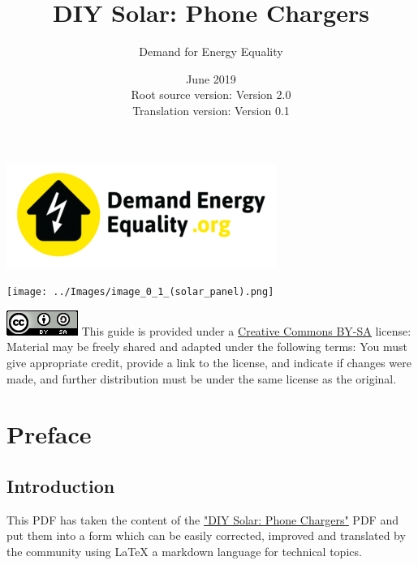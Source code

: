 \documentclass{article}
\title{DIY Solar: Phone Chargers}
\author{Demand for Energy Equality}
\date{June 2019 \\ Root source version: Version 2.0 \\ Translation version: Version 0.1}
\theoremstyle{definition}
\theoremstyle{definition}
\theoremstyle{remark}
\begin{document}
 
\maketitle{}

\begin{center}
  \includegraphics[width=0.25\paperwidth]{../Images/image_0_0_(demand_energy_equality).png}
\end{center}

\begin{center}
  \texttt{[image: ../Images/image\_0\_1\_(solar\_panel).png]}
\end{center}

\vfill
  
\includegraphics[]{../Images/image_0_2_(license).png} \newline
This guide is provided under a \href{https://creativecommons.org/licenses/by-sa/4.0/legalcode}{\underline{Creative Commons BY-SA}} license: \newline
Material may be freely shared and adapted under the following terms: You must give appropriate credit, provide a link to the license, and indicate if changes were made, and further distribution must be under the same license as the original.

\newpage

\tableofcontents

\newpage

{\color{blue}\section{Preface}} %
\label{sec:preface}

  {\color{blue}\subsection*{Introduction}} %
  \label{sub:introduction}
  
    This PDF has taken the content of the \href{https://www.demandenergyequality.org/build-your-own-panels}{\underline{"DIY Solar: Phone Chargers"}} PDF and put them into a form which can be easily corrected, improved and translated by the community using LaTeX a markdown language for technical topics.
\end{document}
